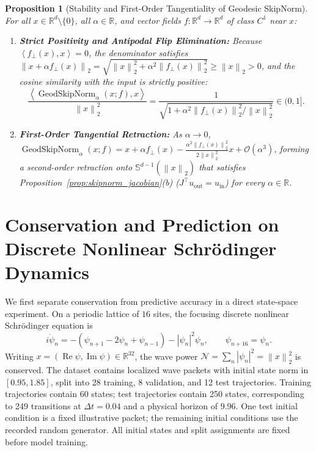 \documentclass[10pt]{article}
\newtheorem{proposition}{Proposition}
\theoremstyle{definition}
\theoremstyle{remark}
\newcommand{\R}{\mathbb{R}}
\newcommand{\Sp}{\mathbb{S}}
\newcommand{\norm}[1]{\left\lVert #1 \right\rVert}
\newcommand{\inner}[1]{\left\langle #1 \right\rangle}
\begin{document}
\begin{proposition}[Stability and First-Order Tangentiality of Geodesic SkipNorm]
\label{prop:geodesic_skipnorm}
For all $x \in \R^d \setminus \{0\}$, all $\alpha \in \R$, and vector fields $f: \R^d \to \R^d$ of class $C^1$ near $x$:
\begin{enumerate}
    \item[\textbf{(a)}] \textbf{Strict Positivity and Antipodal Flip Elimination:} Because $\inner{f_\perp(x), x} = 0$, the denominator satisfies $\norm{x + \alpha f_\perp(x)}_2 = \sqrt{\norm{x}_2^2 + \alpha^2 \norm{f_\perp(x)}_2^2} \ge \norm{x}_2 > 0$, and the cosine similarity with the input is strictly positive:
    \begin{equation}
        \frac{\inner{\operatorname{GeodSkipNorm}_\alpha(x; f), x}}{\norm{x}_2^2} = \frac{1}{\sqrt{1 + \alpha^2 \norm{f_\perp(x)}_2^2 / \norm{x}_2^2}} \in (0, 1].
        \label{eq:geodesic_cosine}
    \end{equation}
    \item[\textbf{(b)}] \textbf{First-Order Tangential Retraction:} As $\alpha \to 0$, $\operatorname{GeodSkipNorm}_\alpha(x; f) = x + \alpha f_\perp(x) - \frac{\alpha^2 \norm{f_\perp(x)}_2^2}{2 \norm{x}_2^2} x + \mathcal{O}(\alpha^3)$, forming a second-order retraction onto $\Sp^{d-1}(\norm{x}_2)$ that satisfies Proposition~\ref{prop:skipnorm_jacobian}(b) ($J^\top u_{\mathrm{out}} = u_{\mathrm{in}}$) for every $\alpha \in \R$.
\end{enumerate}
\end{proposition}

\section{Conservation and Prediction on Discrete Nonlinear Schr\"odinger Dynamics}
\label{sec:dnls}

We first separate conservation from predictive accuracy in a direct state-space experiment. On a periodic lattice of $16$ sites, the focusing discrete nonlinear Schr\"odinger equation is
\begin{equation}
 i\dot\psi_n=-(\psi_{n+1}-2\psi_n+\psi_{n-1})-|\psi_n|^2\psi_n,
 \qquad \psi_{n+16}=\psi_n.
 \label{eq:dnls_pde}
\end{equation}
Writing $x=(\operatorname{Re}\psi,\operatorname{Im}\psi)\in\R^{32}$, the wave power $\mathcal N=\sum_n|\psi_n|^2=\norm{x}_2^2$ is conserved. The dataset contains localized wave packets with initial state norm in $[0.95,1.85]$, split into 28 training, 8 validation, and 12 test trajectories. Training trajectories contain 60 states; test trajectories contain 250 states, corresponding to 249 transitions at $\Delta t=0.04$ and a physical horizon of $9.96$. One test initial condition is a fixed illustrative packet; the remaining initial conditions use the recorded random generator. All initial states and split assignments are fixed before model training.
\end{document}
